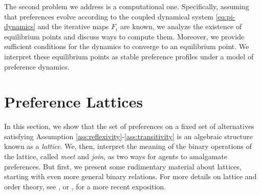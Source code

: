 \documentclass[conference]{ieeeconf}
\newcommand{\N}{\mathcal{N}}
\newcommand{\A}{\mathcal{A}}
\newcommand{\prefers}{\succsim}
\newcommand{\profile}{\boldsymbol{\pi}}
\newcommand{\metaprefers}{\sqsupseteq}
\begin{document}
The second problem we address is a computational one. Specifically, assuming that preferences evolve according to the coupled dynamical system \eqref{eq:pi-dynamics} and the iterative maps $F_i$ are known, we analyze the existence of equilibrium points and discuss ways to compute them. Moreover, we provide sufficient conditions for the dynamics to converge to an equilibrium point. We interpret these equilibrium points as stable preference profiles under a model of preference dynamics.


\vspace{-1em}
\section{Preference Lattices}
\label{sec:lattices}

In this section, we show that the set of preferences on a fixed set of alternatives satisfying Assumption \ref{ass:reflexivity}-\ref{ass:transitivity} is an algebraic structure known as a \emph{lattice}. We, then, interpret the meaning of the binary operations of the lattice, called \emph{meet} and \emph{join}, as two ways for agents to amalgamate preferences.
But first, we present some rudimentary material about lattices, starting with even more general binary relations. For more details on lattice and order theory, see \cite{birkhoff1940}, or \cite{roman2008}, for a more recent exposition.
\end{document}
